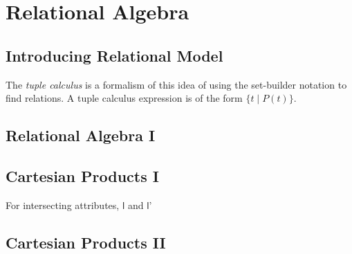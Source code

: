
\chapter{Relational Algebra}

\section{Introducing Relational Model}









The \textit{tuple calculus} is a formalism of this idea 
of using the set-builder notation to find relations. 
A tuple calculus expression is of the form $\{t \;|\; P(t) \}$. 







\section{Relational Algebra I}













\section{Cartesian Products I}


For intersecting attributes, 
$\textsf{l}$ and $\textsf{l'}$





\section{Cartesian Products II}


